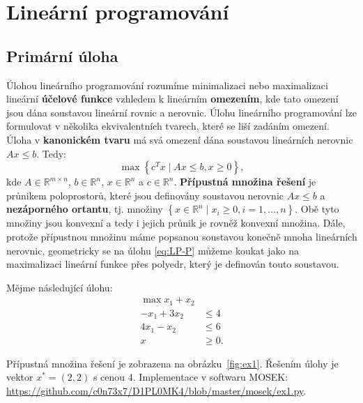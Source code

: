 \chapter{Lineární programování}

\section{Primární úloha}

Úlohou lineárního programování rozumíme minimalizaci nebo maximalizaci lineární \textbf{účelové funkce} vzhledem k lineárním \textbf{omezením}, kde tato omezení jsou dána soustavou lineární rovnic a nerovnic. Úlohu lineárního programování lze formulovat v několika ekvivalentních tvarech, které se liší zadáním omezení. Úloha v \textbf{kanonickém tvaru} má svá omezení dána soustavou lineárních nerovnic $Ax \leq b$. Tedy:
\begin{equation}\tag{LP-P}
    \max \left\{ c^T x \mid Ax \leq b, x \geq 0 \right\},
    \label{eq:LP-P}
\end{equation}
kde $A \in \mathbb{R}^{m \times n}$, $b \in \mathbb{R}^n$, $x \in \mathbb{R}^n$ a $c \in \mathbb{R}^n$. \textbf{Přípustná množina řešení} je průnikem poloprostorů, které jsou definovány soustavou nerovnic $Ax \leq b$ a \textbf{nezáporného ortantu}, tj. množiny $\left\{ x \in \mathbb{R}^n \mid x_i \geq 0, i = 1, \dots, n \right\}$. Obě tyto množiny jsou konvexní a tedy i jejich průnik je rovněž konvexní množina. Dále, protože přípustnou množinu máme popsanou soustavou konečně mnoha lineárních nerovnic, geometricky se na úlohu \ref{eq:LP-P} můžeme koukat jako na maximalizaci lineární funkce přes polyedr, který je definován touto soustavou.

\begin{pr}
Mějme následující úlohu:
\begin{equation}\tag{P1}
    \begin{split}
        \max x_1 + x_2 &       \\
        - x_1 + 3 x_2  &\leq 4 \\
        4 x_1 -   x_2  &\leq 6 \\
        x &\geq 0.
    \end{split}
    \label{eq:P1}
\end{equation}

Přípustná množina řešení je zobrazena na obrázku~\ref{fig:ex1}. Řešením úlohy je vektor $x^* = (2, 2)$ s cenou $4$. Implementace v softwaru MOSEK: \url{https://github.com/c0n73x7/D1PL0MK4/blob/master/mosek/ex1.py}.
\end{pr}

